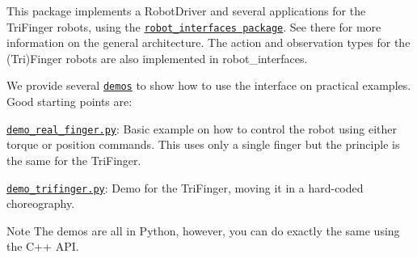 This package implements a Robot\+Driver and several applications for the Tri\+Finger robots, using the \href{https://open-dynamic-robot-initiative.github.io/code_documentation/robot_interfaces/docs/doxygen/html/index.html}{\tt {\ttfamily robot\+\_\+interfaces} package}. See there for more information on the general architecture. The action and observation types for the (Tri)Finger robots are also implemented in {\ttfamily robot\+\_\+interfaces}.

We provide several \href{https://github.com/open-dynamic-robot-initiative/robot_fingers/blob/master/demos}{\tt demos} to show how to use the interface on practical examples. Good starting points are\+:


\begin{DoxyItemize}
\item \href{https://github.com/open-dynamic-robot-initiative/robot_fingers/blob/master/demos/demo_real_finger.py}{\tt demo\+\_\+real\+\_\+finger.\+py}\+: Basic example on how to control the robot using either torque or position commands. This uses only a single finger but the principle is the same for the Tri\+Finger.
\item \href{https://github.com/open-dynamic-robot-initiative/robot_fingers/blob/master/demos/demo_trifinger.py}{\tt demo\+\_\+trifinger.\+py}\+: Demo for the Tri\+Finger, moving it in a hard-\/coded choreography.
\end{DoxyItemize}

\begin{DoxyNote}{Note}
The demos are all in Python, however, you can do exactly the same using the C++ A\+PI. 
\end{DoxyNote}
